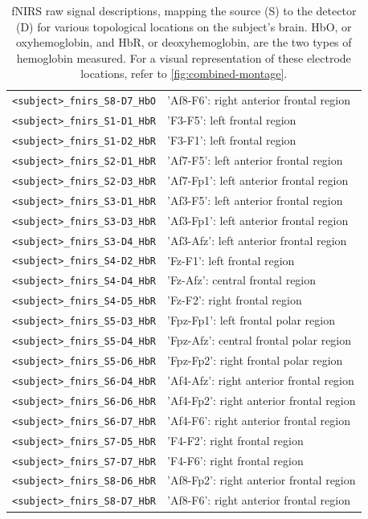 \begin{table}
\begin{tabularx}{\textwidth}{lX}
    \texttt{<subject>\_fnirs\_S8-D7\_HbO} & 'Af8-F6': right anterior frontal region  \\
    \texttt{<subject>\_fnirs\_S1-D1\_HbR} & 'F3-F5': left frontal region  \\
    \texttt{<subject>\_fnirs\_S1-D2\_HbR} & 'F3-F1': left frontal region  \\
    \texttt{<subject>\_fnirs\_S2-D1\_HbR} & 'Af7-F5': left anterior frontal region  \\
    \texttt{<subject>\_fnirs\_S2-D3\_HbR} & 'Af7-Fp1': left anterior frontal region  \\
    \texttt{<subject>\_fnirs\_S3-D1\_HbR} & 'Af3-F5': left anterior frontal region  \\
    \texttt{<subject>\_fnirs\_S3-D3\_HbR} & 'Af3-Fp1': left anterior frontal region  \\
    \texttt{<subject>\_fnirs\_S3-D4\_HbR} & 'Af3-Afz': left anterior frontal region  \\
    \texttt{<subject>\_fnirs\_S4-D2\_HbR} & 'Fz-F1': left frontal region  \\
    \texttt{<subject>\_fnirs\_S4-D4\_HbR} & 'Fz-Afz': central frontal region  \\
    \texttt{<subject>\_fnirs\_S4-D5\_HbR} & 'Fz-F2': right frontal region  \\
    \texttt{<subject>\_fnirs\_S5-D3\_HbR} & 'Fpz-Fp1': left frontal polar region  \\
    \texttt{<subject>\_fnirs\_S5-D4\_HbR} & 'Fpz-Afz': central frontal polar region  \\
    \texttt{<subject>\_fnirs\_S5-D6\_HbR} & 'Fpz-Fp2': right frontal polar region  \\
    \texttt{<subject>\_fnirs\_S6-D4\_HbR} & 'Af4-Afz': right anterior frontal region  \\
    \texttt{<subject>\_fnirs\_S6-D6\_HbR} & 'Af4-Fp2': right anterior frontal region  \\
    \texttt{<subject>\_fnirs\_S6-D7\_HbR} & 'Af4-F6': right anterior frontal region  \\
    \texttt{<subject>\_fnirs\_S7-D5\_HbR} & 'F4-F2': right frontal region  \\
    \texttt{<subject>\_fnirs\_S7-D7\_HbR} & 'F4-F6': right frontal region  \\
    \texttt{<subject>\_fnirs\_S8-D6\_HbR} & 'Af8-Fp2': right anterior frontal region  \\
    \texttt{<subject>\_fnirs\_S8-D7\_HbR} & 'Af8-F6': right anterior frontal region  \\
    \bottomrule
    \end{tabularx}
    \caption{%
        fNIRS raw signal descriptions, mapping the source (S) to the detector
        (D) for various topological locations on the subject's brain. HbO, or
        oxyhemoglobin, and HbR, or deoxyhemoglobin, are the two types of
        hemoglobin measured. For a visual representation of these electrode
        locations, refer to \autoref{fig:combined-montage}.
    }
    \label{tab:fNIRS_signals}
    \end{table}

